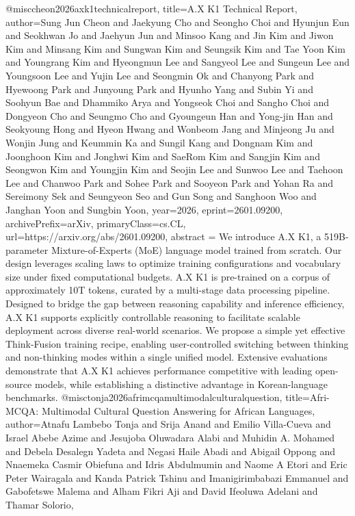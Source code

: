 {}@misc{cheon2026axk1technicalreport,
      title={A.X K1 Technical Report}, 
      author={Sung Jun Cheon and Jaekyung Cho and Seongho Choi and Hyunjun Eun and Seokhwan Jo and Jaehyun Jun and Minsoo Kang and Jin Kim and Jiwon Kim and Minsang Kim and Sungwan Kim and Seungsik Kim and Tae Yoon Kim and Youngrang Kim and Hyeongmun Lee and Sangyeol Lee and Sungeun Lee and Youngsoon Lee and Yujin Lee and Seongmin Ok and Chanyong Park and Hyewoong Park and Junyoung Park and Hyunho Yang and Subin Yi and Soohyun Bae and Dhammiko Arya and Yongseok Choi and Sangho Choi and Dongyeon Cho and Seungmo Cho and Gyoungeun Han and Yong-jin Han and Seokyoung Hong and Hyeon Hwang and Wonbeom Jang and Minjeong Ju and Wonjin Jung and Keummin Ka and Sungil Kang and Dongnam Kim and Joonghoon Kim and Jonghwi Kim and SaeRom Kim and Sangjin Kim and Seongwon Kim and Youngjin Kim and Seojin Lee and Sunwoo Lee and Taehoon Lee and Chanwoo Park and Sohee Park and Sooyeon Park and Yohan Ra and Sereimony Sek and Seungyeon Seo and Gun Song and Sanghoon Woo and Janghan Yoon and Sungbin Yoon},
      year={2026},
      eprint={2601.09200},
      archivePrefix={arXiv},
      primaryClass={cs.CL},
      url={https://arxiv.org/abs/2601.09200},
      abstract = {We introduce A.X K1, a 519B-parameter Mixture-of-Experts (MoE) language model trained from scratch. Our design leverages scaling laws to optimize training configurations and vocabulary size under fixed computational budgets. A.X K1 is pre-trained on a corpus of approximately 10T tokens, curated by a multi-stage data processing pipeline. Designed to bridge the gap between reasoning capability and inference efficiency, A.X K1 supports explicitly controllable reasoning to facilitate scalable deployment across diverse real-world scenarios. We propose a simple yet effective Think-Fusion training recipe, enabling user-controlled switching between thinking and non-thinking modes within a single unified model. Extensive evaluations demonstrate that A.X K1 achieves performance competitive with leading open-source models, while establishing a distinctive advantage in Korean-language benchmarks.}
}@misc{tonja2026afrimcqamultimodalculturalquestion,
      title={Afri-MCQA: Multimodal Cultural Question Answering for African Languages}, 
      author={Atnafu Lambebo Tonja and Srija Anand and Emilio Villa-Cueva and Israel Abebe Azime and Jesujoba Oluwadara Alabi and Muhidin A. Mohamed and Debela Desalegn Yadeta and Negasi Haile Abadi and Abigail Oppong and Nnaemeka Casmir Obiefuna and Idris Abdulmumin and Naome A Etori and Eric Peter Wairagala and Kanda Patrick Tshinu and Imanigirimbabazi Emmanuel and Gabofetswe Malema and Alham Fikri Aji and David Ifeoluwa Adelani and Thamar Solorio},
}
